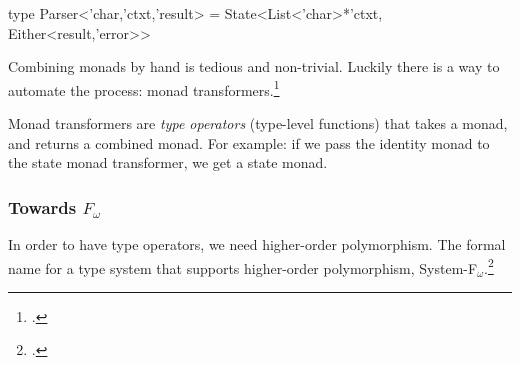 \begin{multicols}{2}
  \begin{code}[language=Caml]
  type Parser<'char,'ctxt,'result> =
    State<List<'char>*'ctxt,
          Either<result,'error>>
  \end{code}

  Combining monads by hand is tedious and non-trivial.
  Luckily there is a way to automate the process: monad transformers.\footcite[Chapter~18]{Haskell}

  Monad transformers are \textit{type operators} (type-level functions) that takes a monad, and returns a combined monad.
  For example: if we pass the identity monad to the state monad transformer, we get a state monad.

  \subsubsection*{Towards $F_\omega$}
  In order to have type operators, we need higher-order polymorphism.
  The formal name for a type system that supports higher-order polymorphism, System-F$_\omega$.\footcite[Chapter~30]{Pierce02}
  
  
\end{multicols}
